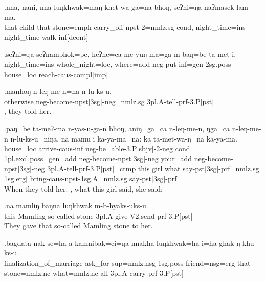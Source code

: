 \exg.nna,  nani,  nna  luŋkhwak=maŋ khet-wa-ga=na   bhoŋ, seʔni=ŋa naʔmasek  lam-ma.\\
that child that stone{\sc =emph} carry\_off{\sc -npst-2=nmlz.sg} {\sc cond},  night\_time{\sc =ins} night\_time walk{\sc -inf[deont]}\\

\exg.seʔni=ŋa seʔnamphok=pe,  heʔne=ca  me-yuŋ-ma=ga  m-baŋ=be  ta-met-i.\\
night\_time{\sc =ins} whole\_night{\sc =loc}, where{\sc =add} {\sc neg-}put{\sc -inf=gen} {\sc 2sg.poss-}house{\sc =loc} reach{\sc -caus-compl[imp]}\\

\exg.manhoŋ n-leŋ-me-n=na     n-lu-ks-u.\\
otherwise {\sc neg-}become{\sc -npst[3sg]-neg=nmlz.sg} {\sc 3pl.A-}tell{\sc -prf-3.P[pst]}\\
, they told her.

\exg.paŋ=be ta-meʔ-ma  n-yas-u-ga-n    bhoŋ, aniŋ=ga=ca   n-leŋ-me-n,   ŋga=ca n-leŋ-me-n    n-lu-ks-u=niŋa, na mamu i  ka-ya-ma=na:    ka ta-met-wa-ŋ=na   ka-ya-ma.\\
house{\sc =loc} arrive{\sc -caus-inf} {\sc neg-}be\_able{\sc -3.P[sbjv]-2-neg} {\sc cond} {\sc 1pl.excl.poss=gen=add} {\sc neg-}become{\sc -npst[3sg]-neg} your{\sc =add} {\sc neg-}become{\sc -npst[3sg]-neg} {\sc 3pl.A-}tell{\sc -prf-3.P[pst]=ctmp} this girl what say{\sc -pst[3sg]-prf=nmlz.sg} {\sc 1sg[erg]} bring{\sc -caus-npst-1sg.A=nmlz.sg} say{\sc -pst[3sg]-prf}\\
When they told her: , what this girl said, she said: 

\exg.na mamliŋ baŋna  luŋkhwak m-b-hyaks-uks-u.\\
this Mamling so-called stone {\sc 3pl.A-}give{\sc -V2.send-prf-3.P[pst]}\\
They gave that so-called Mamling stone to her.

\exg.bagdata  nak-se=ha    a-kamnibak=ci=ŋa   nnakha luŋkhwak=ha   i=ha  ghak ŋ-khu-ks-u.\\
finalization\_of\_marriage ask\_for{\sc -sup=nmlz.nsg} {\sc 1sg.poss-}friend{\sc =nsg=erg} that stone{\sc =nmlz.nc} what{\sc =nmlz.nc} all {\sc 3pl.A-}carry{\sc -prf-3.P[pst]}\\

